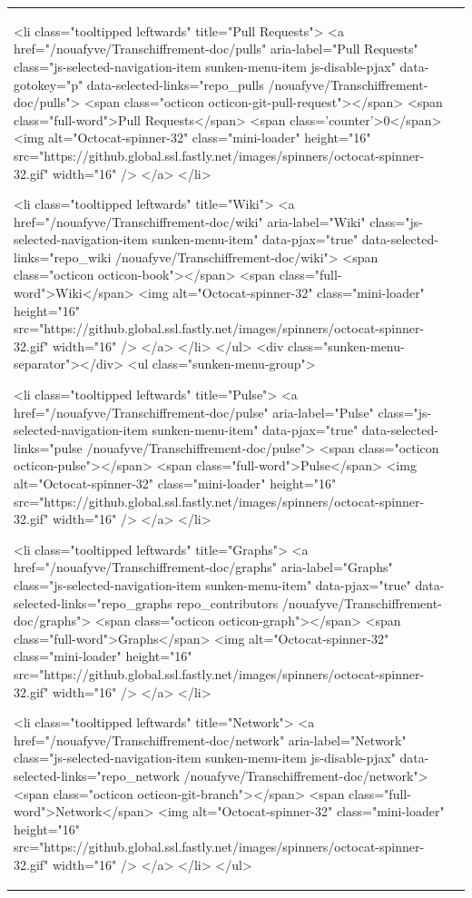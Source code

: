 \documentclass[a4paper,11pt,french]{article}
\begin{document}
\begin{tabular}{|m{8cm}|m{8cm}|}
      <li class="tooltipped leftwards" title="Pull Requests">
        <a href="/nouafyve/Transchiffrement-doc/pulls" aria-label="Pull Requests" class="js-selected-navigation-item sunken-menu-item js-disable-pjax" data-gotokey="p" data-selected-links="repo_pulls /nouafyve/Transchiffrement-doc/pulls">
            <span class="octicon octicon-git-pull-request"></span> <span class="full-word">Pull Requests</span>
            <span class='counter'>0</span>
            <img alt="Octocat-spinner-32" class="mini-loader" height="16" src="https://github.global.ssl.fastly.net/images/spinners/octocat-spinner-32.gif" width="16" />
</a>      </li>


        <li class="tooltipped leftwards" title="Wiki">
          <a href="/nouafyve/Transchiffrement-doc/wiki" aria-label="Wiki" class="js-selected-navigation-item sunken-menu-item" data-pjax="true" data-selected-links="repo_wiki /nouafyve/Transchiffrement-doc/wiki">
            <span class="octicon octicon-book"></span> <span class="full-word">Wiki</span>
            <img alt="Octocat-spinner-32" class="mini-loader" height="16" src="https://github.global.ssl.fastly.net/images/spinners/octocat-spinner-32.gif" width="16" />
</a>        </li>
    </ul>
    <div class="sunken-menu-separator"></div>
    <ul class="sunken-menu-group">

      <li class="tooltipped leftwards" title="Pulse">
        <a href="/nouafyve/Transchiffrement-doc/pulse" aria-label="Pulse" class="js-selected-navigation-item sunken-menu-item" data-pjax="true" data-selected-links="pulse /nouafyve/Transchiffrement-doc/pulse">
          <span class="octicon octicon-pulse"></span> <span class="full-word">Pulse</span>
          <img alt="Octocat-spinner-32" class="mini-loader" height="16" src="https://github.global.ssl.fastly.net/images/spinners/octocat-spinner-32.gif" width="16" />
</a>      </li>

      <li class="tooltipped leftwards" title="Graphs">
        <a href="/nouafyve/Transchiffrement-doc/graphs" aria-label="Graphs" class="js-selected-navigation-item sunken-menu-item" data-pjax="true" data-selected-links="repo_graphs repo_contributors /nouafyve/Transchiffrement-doc/graphs">
          <span class="octicon octicon-graph"></span> <span class="full-word">Graphs</span>
          <img alt="Octocat-spinner-32" class="mini-loader" height="16" src="https://github.global.ssl.fastly.net/images/spinners/octocat-spinner-32.gif" width="16" />
</a>      </li>

      <li class="tooltipped leftwards" title="Network">
        <a href="/nouafyve/Transchiffrement-doc/network" aria-label="Network" class="js-selected-navigation-item sunken-menu-item js-disable-pjax" data-selected-links="repo_network /nouafyve/Transchiffrement-doc/network">
          <span class="octicon octicon-git-branch"></span> <span class="full-word">Network</span>
          <img alt="Octocat-spinner-32" class="mini-loader" height="16" src="https://github.global.ssl.fastly.net/images/spinners/octocat-spinner-32.gif" width="16" />
</a>      </li>
    </ul>



\end{tabular}
\end{document}
